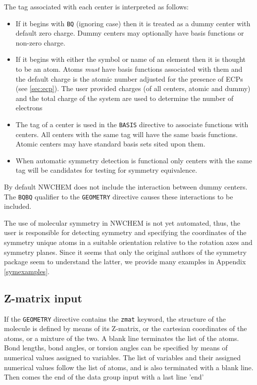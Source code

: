 The tag associated with each center is interpreted as follows:
\begin{itemize}
\item If it begins with \verb+BQ+ (ignoring case) then it is treated
      as a dummy center with default zero charge. Dummy centers may 
      optionally have basis functions or non-zero charge.
\item If it begins with either the symbol or name of an element then
      it is thought to be an atom.  Atoms {\em must} have basis
      functions associated with them and the default charge is the
      atomic number adjusted for the presence of ECPs (see
      \ref{sec:ecp}).  The user provided charges (of all centers,
      atomic and dummy) and the total charge of the system are used to
      determine the number of electrons
\item The tag of a center is used in the \verb+BASIS+ directive to
      associate functions with centers.  All centers with the same tag
      will have the same basis functions.  Atomic centers may have
      standard basis sets sited upon them.
\item When automatic symmetry detection is functional only centers
      with the same tag will be candidates for testing for symmetry
      equivalence.
\end{itemize}

By default NWCHEM does not include the interaction between dummy
centers.  The \verb+BQBQ+ qualifier to the \verb+GEOMETRY+ directive
causes these interactions to be included.

 The use of molecular symmetry in NWCHEM is not yet automated, thus,
the user is responsible for detecting symmetry and specifying the
coordinates of the symmetry unique atoms in a suitable orientation
relative to the rotation axes and symmetry planes.  Since it seems
that only the original authors of the symmetry package seem to
understand the latter, we provide many examples in Appendix
\ref{symexamples}.

\subsection{Z-matrix input}
\label{sec:Z-matrix}
 
If the \verb+GEOMETRY+ directive contains the \verb+zmat+ keyword, the
structure of the molecule is defined by means of its Z-matrix, or
the cartesian coordinates of the atoms, or a mixture of the two. A
blank line terminates the list of the atoms.  Bond lengths,  bond
angles, or torsion angles can be specified by means of numerical
values assigned to variables. The list of variables and  their
assigned numerical  values  follow  the  list  of atoms, and is also
terminated with a blank line.  Then comes the end of the data group
input with a last line 'end'

